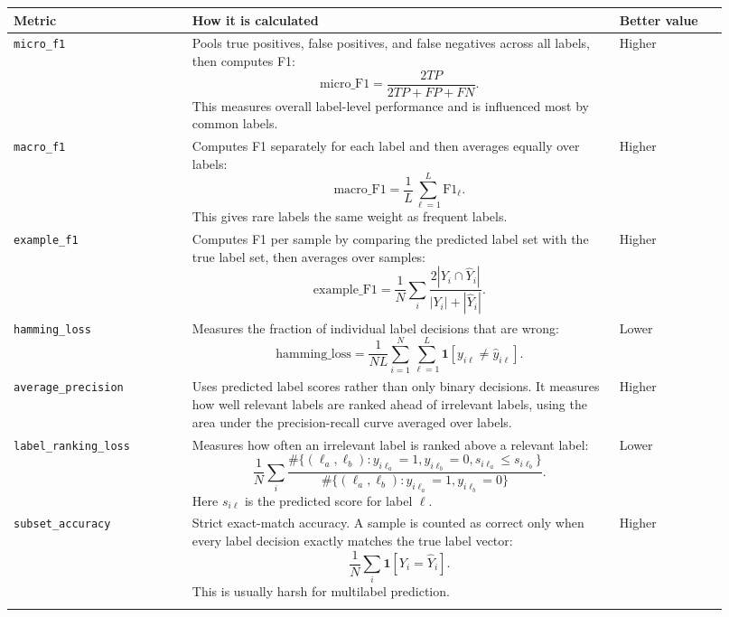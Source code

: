 \documentclass[11pt]{article}
\begin{document}
\begin{longtable}{p{0.23\linewidth} p{0.55\linewidth} p{0.14\linewidth}}
\toprule
\textbf{Metric} & \textbf{How it is calculated} & \textbf{Better value} \\
\midrule
\endhead

\texttt{micro\_f1}
&
Pools true positives, false positives, and false negatives across all labels,
then computes F1:
\[
\mathrm{micro\_F1} =
\frac{2TP}{2TP + FP + FN}.
\]
This measures overall label-level performance and is influenced most by common
labels.
&
Higher
\\
\addlinespace

\texttt{macro\_f1}
&
Computes F1 separately for each label and then averages equally over labels:
\[
\mathrm{macro\_F1} = \frac{1}{L}\sum_{\ell=1}^{L}\mathrm{F1}_{\ell}.
\]
This gives rare labels the same weight as frequent labels.
&
Higher
\\
\addlinespace

\texttt{example\_f1}
&
Computes F1 per sample by comparing the predicted label set with the true label
set, then averages over samples:
\[
\mathrm{example\_F1} =
\frac{1}{N}\sum_i
\frac{2|Y_i \cap \hat{Y}_i|}{|Y_i| + |\hat{Y}_i|}.
\]
&
Higher
\\
\addlinespace

\texttt{hamming\_loss}
&
Measures the fraction of individual label decisions that are wrong:
\[
\mathrm{hamming\_loss} =
\frac{1}{NL}\sum_{i=1}^{N}\sum_{\ell=1}^{L}
\mathbf{1}[y_{i\ell} \ne \hat{y}_{i\ell}].
\]
&
Lower
\\
\addlinespace

\texttt{average\_precision}
&
Uses predicted label scores rather than only binary decisions. It measures how
well relevant labels are ranked ahead of irrelevant labels, using the area under
the precision-recall curve averaged over labels.
&
Higher
\\
\addlinespace

\texttt{label\_ranking\_loss}
&
Measures how often an irrelevant label is ranked above a relevant label:
\[
\frac{1}{N}\sum_i
\frac{
\#\{(\ell_a,\ell_b): y_{i\ell_a}=1, y_{i\ell_b}=0,
s_{i\ell_a} \le s_{i\ell_b}\}
}{
\#\{(\ell_a,\ell_b): y_{i\ell_a}=1, y_{i\ell_b}=0\}
}.
\]
Here $s_{i\ell}$ is the predicted score for label $\ell$.
&
Lower
\\
\addlinespace

\texttt{subset\_accuracy}
&
Strict exact-match accuracy. A sample is counted as correct only when every
label decision exactly matches the true label vector:
\[
\frac{1}{N}\sum_i \mathbf{1}[Y_i = \hat{Y}_i].
\]
This is usually harsh for multilabel prediction.
&
Higher
\\
\addlinespace


\end{longtable}
\end{document}
